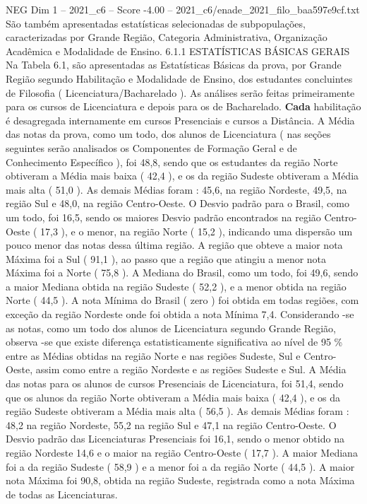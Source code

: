 \begin{textsample}{NEG Dim 1 – 2021\_c6 – Score -4.00 – 2021\_c6/enade\_2021\_filo\_baa597e9cf.txt}
São também apresentadas estatísticas selecionadas de subpopulações, caracterizadas por Grande Região, Categoria Administrativa, Organização Acadêmica e Modalidade de Ensino. 6.1.1 ESTATÍSTICAS BÁSICAS GERAIS Na Tabela 6.1, são apresentadas as Estatísticas Básicas da prova, por Grande Região segundo Habilitação e Modalidade de Ensino, dos estudantes concluintes de Filosofia ( Licenciatura/Bacharelado ).
As análises serão feitas primeiramente para os cursos de Licenciatura e depois para os de Bacharelado. \textbf{Cada} habilitação é desagregada internamente em cursos Presenciais e cursos a Distância.
A Média das notas da prova, como um todo, dos alunos de Licenciatura ( nas seções seguintes serão analisados os Componentes de Formação Geral e de Conhecimento Específico ), foi 48,8, sendo que os estudantes da região Norte obtiveram a Média mais baixa ( 42,4 ), e os da região Sudeste obtiveram a Média mais alta ( 51,0 ).
As demais Médias foram : 45,6, na região Nordeste, 49,5, na região Sul e 48,0, na região Centro-Oeste.
O Desvio padrão para o Brasil, como um todo, foi 16,5, sendo os maiores Desvio padrão encontrados na região Centro-Oeste ( 17,3 ), e o menor, na região Norte ( 15,2 ), indicando uma dispersão um pouco menor das notas dessa última região.
A região que obteve a maior nota Máxima foi a Sul ( 91,1 ), ao passo que a região que atingiu a menor nota Máxima foi a Norte ( 75,8 ).
A Mediana do Brasil, como um todo, foi 49,6, sendo a maior Mediana obtida na região Sudeste ( 52,2 ), e a menor obtida na região Norte ( 44,5 ).
A nota Mínima do Brasil ( zero ) foi obtida em todas regiões, com exceção da região Nordeste onde foi obtida a nota Mínima 7,4.
Considerando -se as notas, como um todo dos alunos de Licenciatura segundo Grande Região, observa -se que existe diferença estatisticamente significativa ao nível de 95 \% entre as Médias obtidas na região Norte e nas regiões Sudeste, Sul e Centro-Oeste, assim como entre a região Nordeste e as regiões Sudeste e Sul.
A Média das notas para os alunos de cursos Presenciais de Licenciatura, foi 51,4, sendo que os alunos da região Norte obtiveram a Média mais baixa ( 42,4 ), e os da região Sudeste obtiveram a Média mais alta ( 56,5 ).
As demais Médias foram : 48,2 na região Nordeste, 55,2 na região Sul e 47,1 na região Centro-Oeste.
O Desvio padrão das Licenciaturas Presenciais foi 16,1, sendo o menor obtido na região Nordeste 14,6 e o maior na região Centro-Oeste ( 17,7 ).
A maior Mediana foi a da região Sudeste ( 58,9 ) e a menor foi a da região Norte ( 44,5 ).
A maior nota Máxima foi 90,8, obtida na região Sudeste, registrada como a nota Máxima de todas as Licenciaturas.

\end{textsample}
